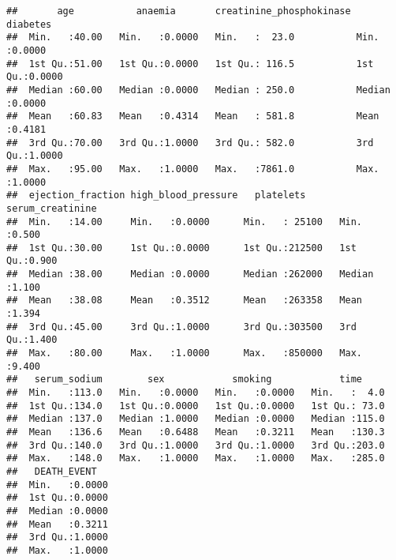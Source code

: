 \documentclass[
]{article}
\begin{document}
\begin{verbatim}
##       age           anaemia       creatinine_phosphokinase    diabetes     
##  Min.   :40.00   Min.   :0.0000   Min.   :  23.0           Min.   :0.0000  
##  1st Qu.:51.00   1st Qu.:0.0000   1st Qu.: 116.5           1st Qu.:0.0000  
##  Median :60.00   Median :0.0000   Median : 250.0           Median :0.0000  
##  Mean   :60.83   Mean   :0.4314   Mean   : 581.8           Mean   :0.4181  
##  3rd Qu.:70.00   3rd Qu.:1.0000   3rd Qu.: 582.0           3rd Qu.:1.0000  
##  Max.   :95.00   Max.   :1.0000   Max.   :7861.0           Max.   :1.0000  
##  ejection_fraction high_blood_pressure   platelets      serum_creatinine
##  Min.   :14.00     Min.   :0.0000      Min.   : 25100   Min.   :0.500   
##  1st Qu.:30.00     1st Qu.:0.0000      1st Qu.:212500   1st Qu.:0.900   
##  Median :38.00     Median :0.0000      Median :262000   Median :1.100   
##  Mean   :38.08     Mean   :0.3512      Mean   :263358   Mean   :1.394   
##  3rd Qu.:45.00     3rd Qu.:1.0000      3rd Qu.:303500   3rd Qu.:1.400   
##  Max.   :80.00     Max.   :1.0000      Max.   :850000   Max.   :9.400   
##   serum_sodium        sex            smoking            time      
##  Min.   :113.0   Min.   :0.0000   Min.   :0.0000   Min.   :  4.0  
##  1st Qu.:134.0   1st Qu.:0.0000   1st Qu.:0.0000   1st Qu.: 73.0  
##  Median :137.0   Median :1.0000   Median :0.0000   Median :115.0  
##  Mean   :136.6   Mean   :0.6488   Mean   :0.3211   Mean   :130.3  
##  3rd Qu.:140.0   3rd Qu.:1.0000   3rd Qu.:1.0000   3rd Qu.:203.0  
##  Max.   :148.0   Max.   :1.0000   Max.   :1.0000   Max.   :285.0  
##   DEATH_EVENT    
##  Min.   :0.0000  
##  1st Qu.:0.0000  
##  Median :0.0000  
##  Mean   :0.3211  
##  3rd Qu.:1.0000  
##  Max.   :1.0000
\end{verbatim}
\end{document}
